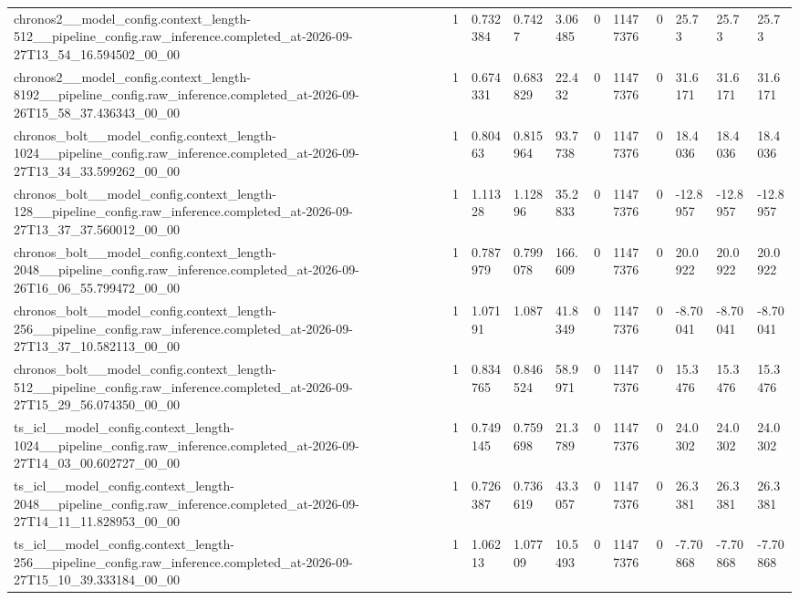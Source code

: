 \begin{tabular}{lllllllllll}
chronos2\_\_model\_config.context\_length-512\_\_pipeline\_config.raw\_inference.completed\_at-2026-09-27T13\_54\_16.594502\_00\_00 & 1 & 0.732384 & 0.7427 & 3.06485 & 0 & 11477376 & 0 & 25.73 & 25.73 & 25.73 \\
chronos2\_\_model\_config.context\_length-8192\_\_pipeline\_config.raw\_inference.completed\_at-2026-09-26T15\_58\_37.436343\_00\_00 & 1 & 0.674331 & 0.683829 & 22.432 & 0 & 11477376 & 0 & 31.6171 & 31.6171 & 31.6171 \\
chronos\_bolt\_\_model\_config.context\_length-1024\_\_pipeline\_config.raw\_inference.completed\_at-2026-09-27T13\_34\_33.599262\_00\_00 & 1 & 0.80463 & 0.815964 & 93.7738 & 0 & 11477376 & 0 & 18.4036 & 18.4036 & 18.4036 \\
chronos\_bolt\_\_model\_config.context\_length-128\_\_pipeline\_config.raw\_inference.completed\_at-2026-09-27T13\_37\_37.560012\_00\_00 & 1 & 1.11328 & 1.12896 & 35.2833 & 0 & 11477376 & 0 & -12.8957 & -12.8957 & -12.8957 \\
chronos\_bolt\_\_model\_config.context\_length-2048\_\_pipeline\_config.raw\_inference.completed\_at-2026-09-26T16\_06\_55.799472\_00\_00 & 1 & 0.787979 & 0.799078 & 166.609 & 0 & 11477376 & 0 & 20.0922 & 20.0922 & 20.0922 \\
chronos\_bolt\_\_model\_config.context\_length-256\_\_pipeline\_config.raw\_inference.completed\_at-2026-09-27T13\_37\_10.582113\_00\_00 & 1 & 1.07191 & 1.087 & 41.8349 & 0 & 11477376 & 0 & -8.70041 & -8.70041 & -8.70041 \\
chronos\_bolt\_\_model\_config.context\_length-512\_\_pipeline\_config.raw\_inference.completed\_at-2026-09-27T15\_29\_56.074350\_00\_00 & 1 & 0.834765 & 0.846524 & 58.9971 & 0 & 11477376 & 0 & 15.3476 & 15.3476 & 15.3476 \\
ts\_icl\_\_model\_config.context\_length-1024\_\_pipeline\_config.raw\_inference.completed\_at-2026-09-27T14\_03\_00.602727\_00\_00 & 1 & 0.749145 & 0.759698 & 21.3789 & 0 & 11477376 & 0 & 24.0302 & 24.0302 & 24.0302 \\
ts\_icl\_\_model\_config.context\_length-2048\_\_pipeline\_config.raw\_inference.completed\_at-2026-09-27T14\_11\_11.828953\_00\_00 & 1 & 0.726387 & 0.736619 & 43.3057 & 0 & 11477376 & 0 & 26.3381 & 26.3381 & 26.3381 \\
ts\_icl\_\_model\_config.context\_length-256\_\_pipeline\_config.raw\_inference.completed\_at-2026-09-27T15\_10\_39.333184\_00\_00 & 1 & 1.06213 & 1.07709 & 10.5493 & 0 & 11477376 & 0 & -7.70868 & -7.70868 & -7.70868 \\

\end{tabular}
